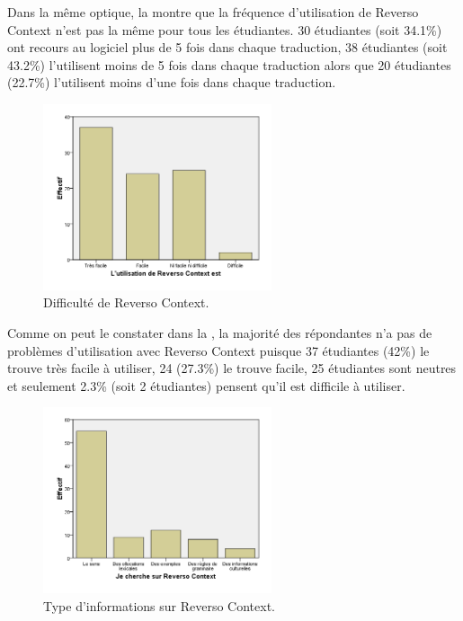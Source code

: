 \documentclass{textolivre}
\begin{document}
Dans la même optique, la  montre que la fréquence d’utilisation de Reverso Context n’est pas la même pour tous les étudiantes. 30 étudiantes (soit 34.1\%) ont recours au logiciel plus de 5 fois dans chaque traduction, 38 étudiantes (soit 43.2\%) l’utilisent moins de 5 fois dans chaque traduction alors que 20 étudiantes (22.7\%) l’utilisent moins d’une fois dans chaque traduction.
\begin{figure}[htbp]
\centering
\includegraphics[width=0.6\textwidth]{fig07.png}
\caption{Difficulté de Reverso Context.}
\label{fig07}
\end{figure}

Comme on peut le constater dans la , la majorité des répondantes n’a pas de problèmes d’utilisation avec Reverso Context puisque 37 étudiantes (42\%) le trouve très facile à utiliser, 24 (27.3\%) le trouve facile, 25 étudiantes sont neutres et seulement 2.3\% (soit 2 étudiantes) pensent qu’il est difficile à utiliser.
\begin{figure}[htbp]
\centering
\includegraphics[width=0.6\textwidth]{fig08.png}
\caption{Type d’informations sur Reverso Context.}
\label{fig08}
\end{figure}
\end{document}
